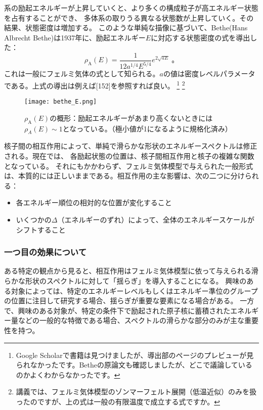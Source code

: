 \documentclass[a4paper,11pt,titlepage,uplatex]{jsarticle}
\begin{document}
系の励起エネルギーが上昇していくと、より多くの構成粒子が高エネルギー状態を占有することができ、
多体系の取りうる異なる状態数が上昇していく。その結果、状態密度は増加する。
このような単純な描像に基づいて、Bethe(Hans Albrecht Bethe)は1937年に、励起エネルギー$E$に対応する状態密度の式を導出した：
\begin{equation}
	\rho_{\text{A}}(E) = \frac{1}{12a^{1/4}E^{5/4}}e^{2\sqrt{aE}}\;。
\end{equation}
これは一般にフェルミ気体の式として知られる。$a$の値は密度レベルパラメータである。上式の導出は例えば[152]を参照すれば良い。
\footnote{Google Scholarで書籍は見つけましたが、導出部のページのプレビューが見られなかったです。Betheの原論文も確認しましたが、どこで議論しているのかよくわからなかったです。}
\footnote{講義では、フェルミ気体模型のゾンマーフェルト展開（低温近似）のみを扱ったのですが、上の式は一般の有限温度で成立する式ですか。}
\begin{figure}[H]
	\centering
	\texttt{[image: bethe\_E.png]}
	\caption{$\rho_{\text{A}}(E)$の概形：励起エネルギーがあまり高くないときには$\rho_A(E)\sim 1$となっている。（極小値が1になるように規格化済み）}
	\label{fig:bethe_E}
\end{figure}

核子間の相互作用によって、単純で滑らかな形状のエネルギースペクトルは修正される。現在では、
各励起状態の位置は、核子間相互作用と核子の複雑な関数となっている。
それにもかかわらず、フェルミ気体模型で与えられた一般形式は、本質的には正しいままである。相互作用の主な影響は、次の二つに分けられる：
\begin{itemize}
	\item 各エネルギー順位の相対的な位置が変化すること
	\item いくつかの$\varDelta$（エネルギーのずれ）によって、全体のエネルギースケールがシフトすること
\end{itemize}

\subsubsection*{一つ目の効果について}
ある特定の観点から見ると、相互作用はフェルミ気体模型に依って与えられる滑らかな形状のスペクトルに対して「揺らぎ」を導入することになる。
興味のある対象によっては、特定のエネルギーレベルもしくはエネルギー準位のグループの位置に注目して研究する場合、揺らぎが重要な要素になる場合がある。
一方で、興味のある対象が、特定の条件下で励起された原子核に蓄積されたエネルギー量などの一般的な特徴である場合、スペクトルの滑らかな部分のみが主な重要性を持つ。
\end{document}
